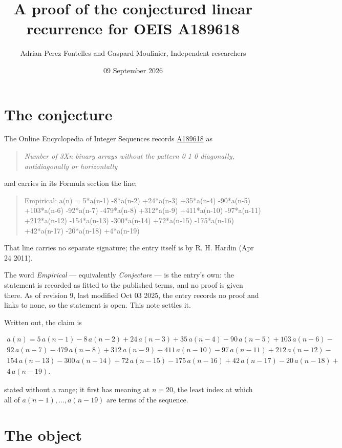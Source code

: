 \documentclass[11pt]{article}
\title{A proof of the conjectured linear recurrence for OEIS A189618}
\author{Adrian Perez Fontelles and Gaspard Moulinier, Independent researchers}
\date{09 September 2026}
\theoremstyle{definition}
\begin{document}
\maketitle
\section{The conjecture}

The Online Encyclopedia of Integer Sequences records \href{https://oeis.org/A189618}{A189618} as

\begin{quote}\itshape Number of 3Xn binary arrays without the pattern 0 1 0 diagonally, antidiagonally or horizontally\end{quote}

and carries in its Formula section the line:

\begin{quote}\ttfamily Empirical: a(n) = 5*a(n-1) -8*a(n-2) +24*a(n-3) +35*a(n-4) -90*a(n-5) +103*a(n-6) -92*a(n-7) -479*a(n-8) +312*a(n-9) +411*a(n-10) -97*a(n-11) +212*a(n-12) -154*a(n-13) -300*a(n-14) +72*a(n-15) -175*a(n-16) +42*a(n-17) -20*a(n-18) +4*a(n-19)\end{quote}

That line carries no separate signature; the entry itself is by R. H. Hardin (Apr 24 2011).

The word {\itshape Empirical} --- equivalently {\itshape Conjecture} --- is the entry's own: the statement is recorded as fitted to the published terms, and no proof is given there. As of revision 9, last modified Oct 03 2025, the entry records no proof and links to none, so the statement is open. This note settles it.

Written out, the claim is

\begin{multline*} a(n) = 5\,a(n-1) - 8\,a(n-2) + 24\,a(n-3) + 35\,a(n-4) - 90\,a(n-5) + 103\,a(n-6) - \\ 92\,a(n-7) - 479\,a(n-8) + 312\,a(n-9) + 411\,a(n-10) - 97\,a(n-11) + 212\,a(n-12) - \\ 154\,a(n-13) - 300\,a(n-14) + 72\,a(n-15) - 175\,a(n-16) + 42\,a(n-17) - 20\,a(n-18) + \\ 4\,a(n-19). \end{multline*}

stated without a range; it first has meaning at $n = 20$, the least index at which all of $a(n-1),\dots,a(n-19)$ are terms of the sequence.

\section{The object}
\end{document}
